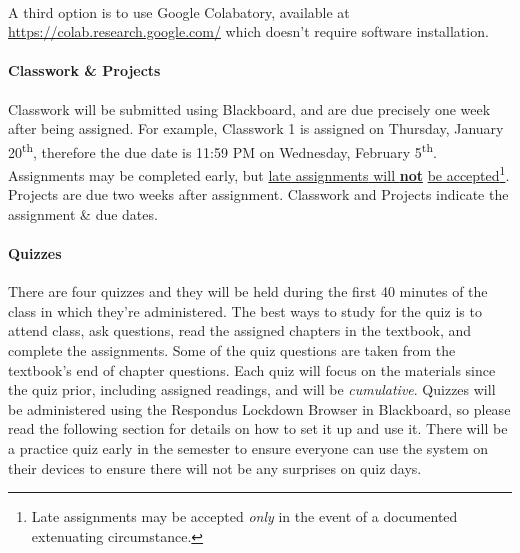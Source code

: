\documentclass[letter,10pt]{article}
\begin{document}
\paragraph{}A third option is to use Google Colabatory, available at \url{https://colab.research.google.com/} which doesn't require software installation.

\label{sec:cwhw}
\paragraph{Classwork \& Projects}Classwork will be submitted using Blackboard, and are due precisely one week after being assigned. For example, Classwork 1 is assigned on Thursday, January 20\textsuperscript{th}, therefore the due date is 11:59 PM on Wednesday, February 5\textsuperscript{th}. Assignments may be completed early, but \underline{\hypertarget{sec:cwhw}{late assignments} will \textbf{not}} \underline{be accepted}\footnote{Late assignments may be accepted \textit{only} in the event of a documented extenuating circumstance.}. Projects are due two weeks after assignment. Classwork and Projects indicate the assignment \& due dates.

\paragraph{Quizzes}There are four quizzes and they will be held during the first 40 minutes of the class in which they're administered. The best ways to study for the quiz is to attend class, ask questions, read the assigned chapters in the textbook, and complete the assignments. Some of the quiz questions are taken from the textbook's end of chapter questions. Each quiz will focus on the materials since the quiz prior, including assigned readings, and will be \textit{cumulative}. Quizzes will be administered using the Respondus Lockdown Browser in Blackboard, so please read the following section for details on how to set it up and use it. There will be a practice quiz early in the semester to ensure everyone can use the system on their devices to ensure there will not be any surprises on quiz days.
\end{document}

